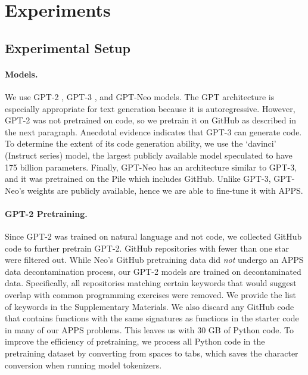 \section{Experiments}







\subsection{Experimental Setup}







\paragraph{Models.}
We use GPT-2 \citep{radford2019language}, GPT-3 \citep{Brown2020LanguageMA}, and GPT-Neo \citep{gpt-neo} models. The GPT architecture is especially appropriate for text generation because it is autoregressive. However, GPT-2 was not pretrained on code, so we pretrain it on GitHub as described in the next paragraph. Anecdotal evidence indicates that GPT-3 can generate code. To determine the extent of its code generation ability, we use the `davinci' (Instruct series) model, the largest publicly available model speculated to have 175 billion parameters. Finally, GPT-Neo has an architecture similar to GPT-3, and it was pretrained on the Pile \citep{gao2020pile} which includes GitHub. Unlike GPT-3, GPT-Neo's weights are publicly available, hence we are able to fine-tune it with APPS.






\paragraph{GPT-2 Pretraining.}
Since GPT-2 was trained on natural language and not code, we collected GitHub code to further pretrain GPT-2. GitHub repositories with fewer than one star were filtered out.
While Neo's GitHub pretraining data did \emph{not} undergo an APPS data decontamination process, our GPT-2 models are trained on decontaminated data.
Specifically, all repositories matching certain keywords that would suggest overlap with common programming exercises were removed. We provide the list of keywords in the Supplementary Materials. We also discard any GitHub code that contains functions with the same signatures as functions in the starter code in many of our APPS problems. This leaves us with 30 GB of Python code. To improve the efficiency of pretraining, we process all Python code in the pretraining dataset by converting from spaces to tabs, which saves the character conversion when running model tokenizers.



